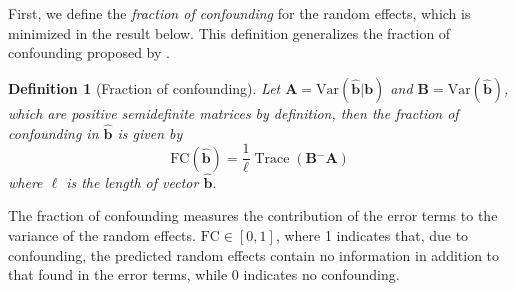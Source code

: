 \documentclass[12pt]{article} %
\newtheorem{definition}{Definition}
\newcommand{\ginv}{\ensuremath{^{-}}}
\newcommand{\trans}{\ensuremath{^\prime}}
\newcommand{\var}{\ensuremath{\mathrm{Var}}}
\DeclareMathOperator{\tr}{Trace}
\begin{document}
First, we define the \emph{fraction of confounding} for the random effects, which is minimized in the result below. This definition generalizes the fraction of confounding proposed by \cite{HildenMinton:1995wh}. \\

%



\begin{definition}[Fraction of confounding]
Let $\bm{A} = \var(\widehat{\bm{b}} | \bm{b} )$ and $\bm{B} = \var(\widehat{\bm{b}})$, which are positive semidefinite matrices by definition, then the fraction of confounding in $\widehat{\bm{b}}$ is given by
%
\begin{equation}\label{eq:fc2}
\text{FC}(\widehat{\bm{b}}) = \frac{1}{\ell} \tr\left( \bm{B}\ginv\bm{A} \right)
\end{equation}
where $\ell$ is the length of vector $\widehat{\bm{b}}$.
\end{definition}
The fraction of confounding measures the contribution of the error terms  to the variance of the random effects. $\text{FC} \in [0,1]$, where 1 indicates that, due to confounding, the predicted random effects contain no information in addition to that found in the error terms, while 0 indicates no confounding. 
\end{document}
